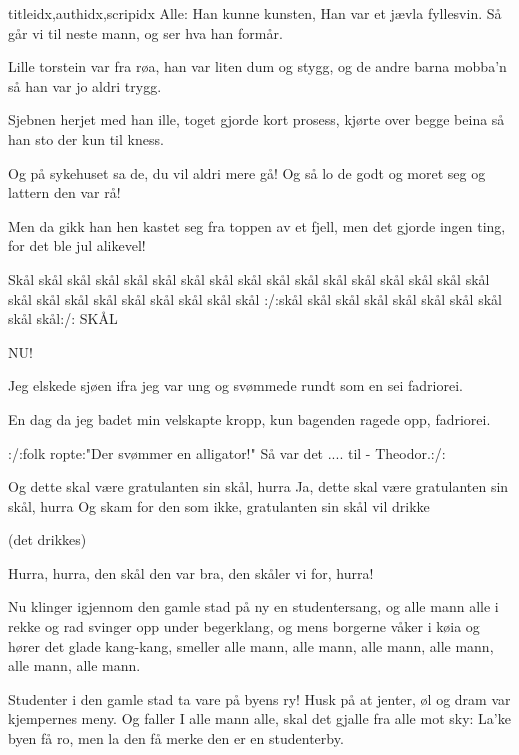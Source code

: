 \documentclass[14pt,letterpaper,norsk]{article}
\begin{document}
\begin{songs}{titleidx,authidx,scripidx}
\beginverse
Alle: Han kunne kunsten,
Han var et jævla fyllesvin.
Så går vi til neste mann, og
ser hva han formår.
\endverse
\endsong


\beginverse
Lille torstein var fra røa,
han var liten dum og stygg,
og de andre barna mobba'n så
han var jo aldri trygg.
\endverse

\beginverse
Sjebnen herjet med han ille,
toget gjorde kort prosess,
kjørte over begge beina
så han sto der kun til kness.
\endverse

\beginverse
Og på sykehuset sa de,
du vil aldri mere gå!
Og så lo de godt og moret seg
og lattern den var rå!
\endverse

\beginverse
Men da gikk han hen kastet seg
fra toppen av et fjell,
men det gjorde ingen ting,
for det ble jul alikevel!
\endverse
\endsong

\beginverse
Skål skål skål skål skål skål skål
skål skål skål skål skål skål
skål skål skål skål skål skål skål
skål skål skål skål skål skål
:/:skål skål skål skål
skål skål skål skål skål skål:/:
SKÅL
\endverse
\endsong

\beginverse
NU!
\endverse
\endsong

\beginverse
Jeg elskede sjøen ifra jeg var ung
og svømmede rundt som en sei
fadriorei.
\endverse

\beginverse
En dag da jeg badet min velskapte kropp,
kun bagenden ragede opp,
fadriorei.
\endverse

\beginverse
:/:folk ropte:"Der svømmer en alligator!"
Så var det .... til - Theodor.:/:
\endverse
\endsong

\beginverse
Og dette skal være gratulanten sin skål, hurra
Ja, dette skal være gratulanten sin skål, hurra
Og skam for den som ikke, gratulanten sin skål vil drikke

(det drikkes)

Hurra, hurra, den skål den var bra, den skåler vi for, hurra!
\endverse
\endsong

\beginverse
Nu klinger igjennom den gamle stad på ny en studentersang,
og alle mann alle i rekke og rad svinger opp under begerklang,
og mens borgerne våker i køia og hører det glade kang-kang,
smeller alle mann, alle mann, alle mann, alle mann, alle mann, alle mann.
\endverse

\beginchorus
Studenter i den gamle stad ta vare på byens ry!
Husk på at jenter, øl og dram var kjempernes meny.
Og faller I alle mann alle, skal det gjalle fra alle mot sky:
La'ke byen få ro, men la den få merke den er en studenterby.
\endchorus


\end{songs}
\end{document}
